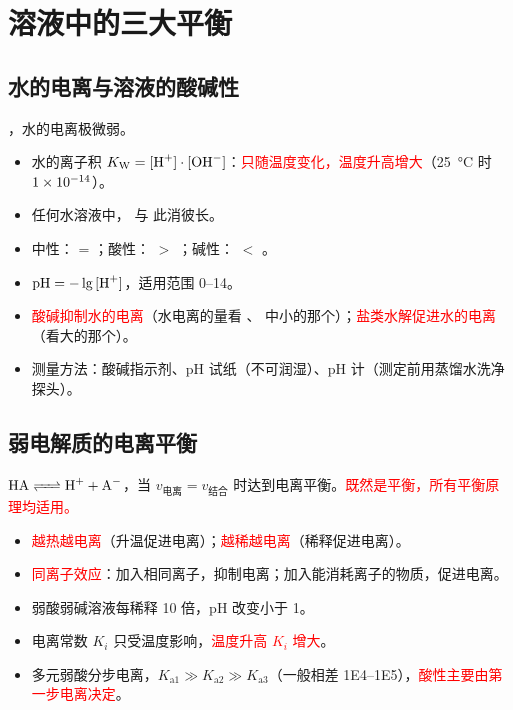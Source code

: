     \section{溶液中的三大平衡}\label{app:知识点-三大平衡}

        \subsection{水的电离与溶液的酸碱性}

            ，水的电离极微弱。

            \begin{itemize}
                \item 水的离子积 \(K_\text{W} = \cemh{[H+]} \cdot \cemh{[OH^-]}\)：\textcolor{red}{只随温度变化，温度升高增大}（\SI{25}{\degreeCelsius} 时 \(\num{1E-14}\)）。
                \item 任何水溶液中，\cemh{[H+]} 与 \cemh{[OH^-]} 此消彼长。
                \item 中性：\cemh{[H+]} = \cemh{[OH^-]}；酸性：\cemh{[H+]} \(>\) \cemh{[OH^-]}；碱性：\cemh{[H+]} \(<\) \cemh{[OH^-]}。
                \item \(\cemh{pH} = -\lg{}\cemh{[H+]}\)，适用范围 \numrange{0}{14}。
                \item \textcolor{red}{酸碱抑制水的电离}（水电离的量看 \cemh{[H+]}、\cemh{[OH^-]} 中小的那个）；\textcolor{red}{盐类水解促进水的电离}（看大的那个）。
                \item 测量方法：酸碱指示剂、pH 试纸（不可润湿）、pH 计（测定前用蒸馏水洗净探头）。
            \end{itemize}

        \subsection{弱电解质的电离平衡}

            \(\cemh{HA <=> H+ + A-}\)，当 \(v_\text{电离} = v_\text{结合}\) 时达到电离平衡。\textcolor{red}{既然是平衡，所有平衡原理均适用。}

            \begin{itemize}
                \item \textcolor{red}{越热越电离}（升温促进电离）；\textcolor{red}{越稀越电离}（稀释促进电离）。
                \item \textcolor{red}{同离子效应}：加入相同离子，抑制电离；加入能消耗离子的物质，促进电离。
                \item 弱酸弱碱溶液每稀释 10 倍，pH 改变小于 1。
                \item 电离常数 \(K_i\) 只受温度影响，\textcolor{red}{温度升高 \(K_i\) 增大}。
                \item 多元弱酸分步电离，\(K_\text{a1} \gg K_\text{a2} \gg K_\text{a3}\)（一般相差 \numrange{1E4}{1E5}），\textcolor{red}{酸性主要由第一步电离决定}。
            \end{itemize}

